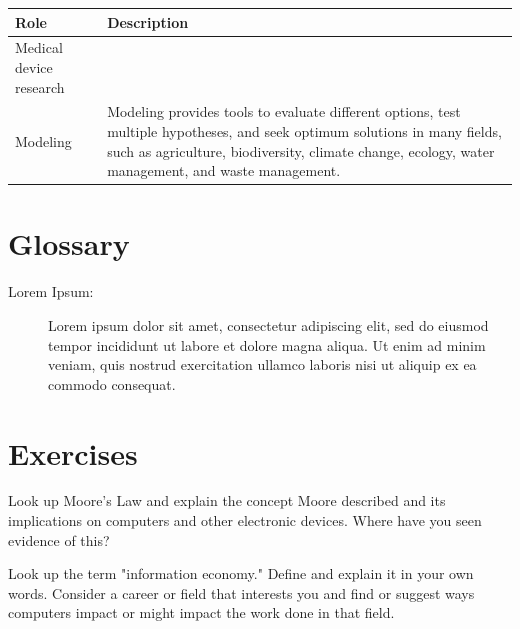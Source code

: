 \begin{table}[H]
	\begin{center}
		\begin{tabular}{p{1in}|p{3.4in}} 
			\textbf{Role} & \textbf{Description}\\
			\hline
			Medical device research & \\
			\hline
			Modeling & Modeling provides tools to evaluate different options, test multiple hypotheses, and seek optimum solutions in many fields, such as agriculture, biodiversity, climate change, ecology, water management, and waste management.\\
			\hline
		\end{tabular}
	\end{center}
\end{table}

\section{Glossary}

\begin{description}
	
	\item[Lorem Ipsum:]  Lorem ipsum dolor sit amet, consectetur adipiscing elit, sed do eiusmod tempor incididunt ut labore et dolore magna aliqua. Ut enim ad minim veniam, quis nostrud exercitation ullamco laboris nisi ut aliquip ex ea commodo consequat.
	
\end{description}

\section{Exercises}

\begin{ex}
	Look up Moore's Law and explain the concept Moore described and its implications on computers and other electronic devices. Where have you seen evidence of this?	
\end{ex}

\begin{ex}
	Look up the term "information economy." Define and explain it in your own words. Consider a career or field that interests you and find or suggest ways computers impact or might impact the work done in that field.
\end{ex}

